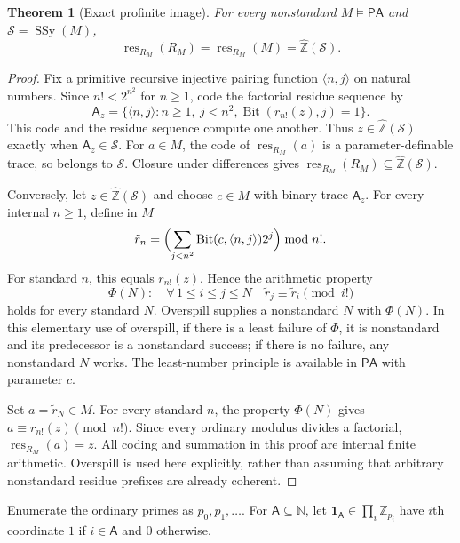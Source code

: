 \documentclass[11pt]{article}
\newtheorem{theorem}{Theorem}[section]
\theoremstyle{definition}
\theoremstyle{remark}
\newcommand{\Z}{\mathbb{Z}}
\newcommand{\N}{\mathbb{N}}
\newcommand{\Zhat}{\widehat{\Z}}
\newcommand{\res}{\operatorname{res}}
\newcommand{\PA}{\mathsf{PA}}
\newcommand{\SSy}{\operatorname{SSy}}
\newcommand{\Bit}{\operatorname{Bit}}
\begin{document}
\begin{theorem}[Exact profinite image]\label{isg:ptg:thm:profinite}
For every nonstandard $M\models\PA$ and $\mathcal S=\SSy(M)$,
\[
 \res_{R_M}(R_M)=\res_{R_M}(M)=\Zhat(\mathcal S).
\]
\end{theorem}
\begin{proof}
Fix a primitive recursive injective pairing function $\langle n,j\rangle$
on natural numbers. Since $n!<2^{n^2}$ for $n\geq1$, code the factorial
residue sequence by
\[
 \mathsf A_z=\{\langle n,j\rangle:n\geq1,\ j<n^2,
                   \Bit(r_{n!}(z),j)=1\}.
\]
This code and the residue sequence compute one another. Thus
$z\in\Zhat(\mathcal S)$ exactly when $\mathsf A_z\in\mathcal S$. For
$a\in M$, the code of $\res_{R_M}(a)$ is a parameter-definable trace, so
belongs to $\mathcal S$. Closure under differences gives
$\res_{R_M}(R_M)\subseteq\Zhat(\mathcal S)$.

Conversely, let $z\in\Zhat(\mathcal S)$ and choose $c\in M$ with binary
trace $\mathsf A_z$. For every internal $n\geq1$, define in $M$
\[
 \tilde r_n=\Bigl(\sum_{j<n^2}
       \Bit(c,\langle n,j\rangle)2^j\Bigr)\bmod n!.
\]
For standard $n$, this equals $r_{n!}(z)$. Hence the arithmetic property
\[
 \Phi(N):\quad
 \forall\,1\leq i\leq j\leq N\quad \tilde r_j\equiv \tilde r_i\pmod{i!}
\]
holds for every standard $N$. Overspill supplies a nonstandard $N$ with
$\Phi(N)$. In this elementary use of overspill, if there is a least failure
of $\Phi$, it is nonstandard and its predecessor is a nonstandard success;
if there is no failure, any nonstandard $N$ works. The least-number
principle is available in $\PA$ with parameter $c$.

Set $a=\tilde r_N\in M$. For every standard $n$, the property $\Phi(N)$ gives
$a\equiv r_{n!}(z)\pmod{n!}$. Since every ordinary modulus divides a
factorial, $\res_{R_M}(a)=z$. All coding and summation in this proof are
internal finite arithmetic. Overspill is used here explicitly, rather than
assuming that arbitrary nonstandard residue prefixes are already coherent.
\end{proof}

Enumerate the ordinary primes as $p_0,p_1,\ldots$. For
$\mathsf A\subseteq\N$, let $\mathbf 1_{\mathsf A}\in\prod_i\mathbb Z_{p_i}$
have $i$th coordinate $1$ if $i\in\mathsf A$ and $0$ otherwise.
\end{document}
